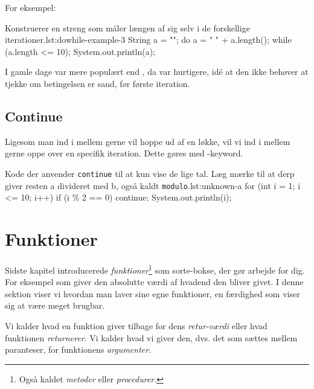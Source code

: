 		For eksempel:

		\begin{JavaCode}{Konstruerer en streng som måler længen af sig selv i de forskellige iterationer.}{lst:dowhile-example-3}
			String a = "";
			do {
				a = " " + a.length();
			} while (a.length <= 10);
			System.out.println(a);
		\end{JavaCode}

        I gamle dage var  mere populært end
        , da  var
        hurtigere, idé at den ikke behøver at tjekke om betingelsen er
        sand, før første iteration.

	\subsection{Continue}

        Ligesom man ind i mellem gerne vil hoppe ud af en løkke, vil
        vi ind i mellem gerne oppe over en specifik iteration. Dette
        gøres med -keyword.

        \begin{JavaCode}{Kode der anvender \texttt{continue} til at kun vise de lige tal. Læg mærke til at derp giver resten a divideret med b, også kaldt \texttt{modulo}.}{lst:unknown-a}
			for (int i = 1; i <= 10; i++) {
				if (i \% 2 == 0)  continue;
				System.out.println(i);
			}
		\end{JavaCode}


\section{Funktioner}

    Sidste kapitel introducerede \emph{funktioner}\footnote{Også
    kaldet \emph{metoder} eller \emph{procedurer}.} som sorte-bokse,
    der gør arbejde for dig. For eksempel  som
    giver den absolutte værdi af hvadend den bliver givet. I denne
    sektion viser vi hvordan man laver sine egne funktioner, en
    færdighed som viser sig at være meget brugbar.

    Vi kalder hvad en funktion giver tilbage for dens
    \emph{retur-værdi} eller hvad funktionen \emph{returnerer}. Vi
    kalder hvad vi giver den, dvs. det som sættes mellem paranteser,
    for funktionens \emph{argumenter}.

